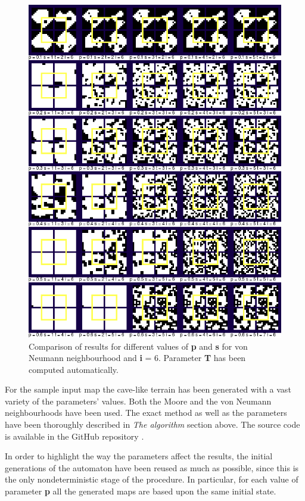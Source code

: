 \documentclass[a4paper, 11pt]{article} %
\begin{document}
\begin{figure}[ht]
        \centering
        \includegraphics[width=1.\textwidth]{neumann_sp}
	\caption{Comparison of results for different values of \textbf{p} and \textbf{s} for von Neumann neighbourhood and \textbf{i} = 6. Parameter \textbf{T} has been computed automatically.}
	\label{fig:results4}
\end{figure}

For the sample input map the cave-like terrain has been generated with a vast variety of the parameters' values. Both the Moore and the von Neumann neighbourhoods have been used. The exact method as well as the parameters have been thoroughly described in \emph{The algorithm} section above. The source code is available in the GitHub repository \cite{repo}.

In order to highlight the way the parameters affect the results, the initial generations of the automaton have been reused as much as possible, since this is the only nondeterministic stage of the procedure. In particular, for each value of parameter \textbf{p} all the generated maps are based upon the same initial state.
\end{document}
